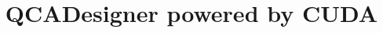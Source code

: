 \documentclass[a4paper,12pt]{report}
\begin{document}
\title{QCADesigner powered by CUDA}

\providecommand{\primoautore}{Gibilisco~\sc{Giovanni Paolo}}               
\providecommand{\primamatricola}{755066}            
\providecommand{\secondoautore}{Marconi~\sc{Francesco}}
\providecommand{\secondamatricola}{755439}
\providecommand{\terzoautore}{Miglierina~\sc{Marco}}
\providecommand{\terzamatricola}{754848}
\providecommand{\instructor}{Prof.ssa Sciuto~\sc{Donatella}}  
\providecommand{\tutor}{Santambrogio~\sc{Marco Domenico}}
\providecommand{\annoacc}{2009-2010}

\titlfp

\titlepage

\headsep 2cm

\setlength{\headwidth}{\textwidth}
  \fancyhead[R]{}


	\fancyfoot[C]{\thepage}
	\renewcommand{\footrulewidth}{0.4pt}

\newpage

\tableofcontents

\newpage

\listoffigures





\newpage


\newpage


\newpage


\newpage



\newpage



\newpage




\end{document}

